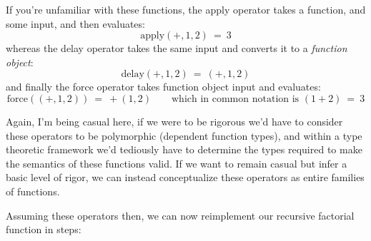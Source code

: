 \documentclass[twoside]{article}
\begin{document}
If you're unfamiliar with these functions, the apply operator takes a function, and some input, and then evaluates:
$$ \mbox{apply}(+, 1, 2)\ =\ 3 $$
whereas the delay operator takes the same input and converts it to a \emph{function object}:
$$ \mbox{delay}(+, 1, 2)\ =\ (+, 1, 2) $$
and finally the force operator takes function object input and evaluates:
$$ \mbox{force}((+, 1, 2))\ =\ +(1,2) \qquad \mbox{which in common notation is } (1 + 2)\ =\ 3 $$

Again, I'm being casual here, if we were to be rigorous we'd have to consider these operators to be polymorphic
(dependent function types), and within a type theoretic framework we'd tediously have to determine the types
required to make the semantics of these functions valid. If we want to remain casual but infer a basic level
of rigor, we can instead conceptualize these operators as entire families of functions.

Assuming these operators then, we can now reimplement our recursive factorial function in steps:
\end{document}
